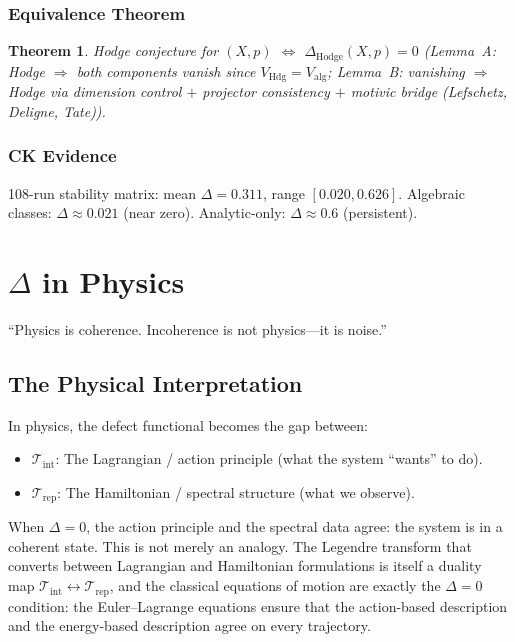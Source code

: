 \documentclass[12pt, openany]{book}
\newtheorem{theorem}{Theorem}[chapter]
\theoremstyle{remark}
\newcommand{\Tint}{\mathcal{T}_{\mathrm{int}}}
\newcommand{\Trep}{\mathcal{T}_{\mathrm{rep}}}
\DeclareMathOperator{\Hdg}{Hdg}
\begin{document}
\subsection{Equivalence Theorem}
\begin{theorem}
Hodge conjecture for $(X, p)$ $\Longleftrightarrow$ $\Delta_{\mathrm{Hodge}}(X, p) = 0$
(Lemma~A: Hodge $\Rightarrow$ both components vanish since $V_{\Hdg} = V_{\mathrm{alg}}$;
Lemma~B: vanishing $\Rightarrow$ Hodge via dimension control $+$ projector consistency
$+$ motivic bridge (Lefschetz, Deligne, Tate)).
\end{theorem}

\subsection{CK Evidence}
108-run stability matrix: mean $\Delta = 0.311$, range $[0.020, 0.626]$.
Algebraic classes: $\Delta \approx 0.021$ (near zero). Analytic-only: $\Delta \approx 0.6$ (persistent).


\chapter{$\Delta$ in Physics}
\label{ch:physics}

\epigraph{``Physics is coherence. Incoherence is not physics---it is noise.''}{}

\section{The Physical Interpretation}

In physics, the defect functional becomes the gap between:
\begin{itemize}
  \item $\Tint$: The Lagrangian / action principle (what the system ``wants'' to do).
  \item $\Trep$: The Hamiltonian / spectral structure (what we observe).
\end{itemize}
When $\Delta = 0$, the action principle and the spectral data agree: the system is in
a coherent state.  This is not merely an analogy.  The
Legendre transform that converts between Lagrangian and Hamiltonian formulations is
itself a duality map $\Tint \leftrightarrow \Trep$, and the classical equations of
motion are exactly the $\Delta = 0$ condition: the Euler--Lagrange equations ensure
that the action-based description and the energy-based description agree on every
trajectory.
\end{document}
